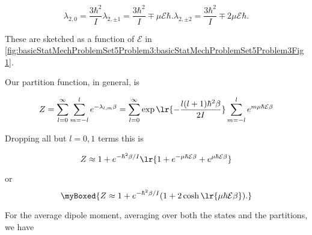 {\begin{subequations}
\begin{equation}\label{eqn:basicStatMechProblemSet5Problem3:160}
\lambda_{2,0} = \frac{3 \hbar^2}{I} 
\end{equation}
\begin{equation}\label{eqn:basicStatMechProblemSet5Problem3:180}
\lambda_{2,\pm 1} = \frac{3 \hbar^2}{I} \mp \mu \mathcal{E} \hbar.
\end{equation}
\begin{equation}\label{eqn:basicStatMechProblemSet5Problem3:200}
\lambda_{2,\pm 2} = \frac{3 \hbar^2}{I} \mp 2 \mu \mathcal{E} \hbar.
\end{equation}
\end{subequations}

These are sketched as a function of $\mathcal{E}$ in \cref{fig:basicStatMechProblemSet5Problem3:basicStatMechProblemSet5Problem3Fig1}.



Our partition function, in general, is

\begin{dmath}\label{eqn:basicStatMechProblemSet5Problem3:220}
Z 
= \sum_{l = 0}^\infty \sum_{m = -l}^l e^{-\lambda_{l,m} \beta}
= \sum_{l = 0}^\infty \exp\lr{ -\frac{l (l+1) \hbar^2 \beta}{2 I}} \sum_{m = -l}^l e^{ m \mu \hbar \mathcal{E} \beta}
\end{dmath}

Dropping all but $l = 0, 1$ terms this is

\begin{equation}\label{eqn:basicStatMechProblemSet5Problem3:380}
Z 
\approx 
1 + e^{-\hbar^2 \beta/I} 
\lr{ 1 + e^{- \mu \hbar \mathcal{E} \beta } + e^{ \mu \hbar \mathcal{E} \beta}}
\end{equation}

or
\begin{equation}\label{eqn:basicStatMechProblemSet5Problem3:400}
\myBoxed{
Z 
\approx 
1 + e^{-\hbar^2 \beta/I} (
1 + 2 \cosh
\lr{ \mu \hbar \mathcal{E} \beta}
).
}
\end{equation}


For the average dipole moment, averaging over both the states and the partitions, we have

}
